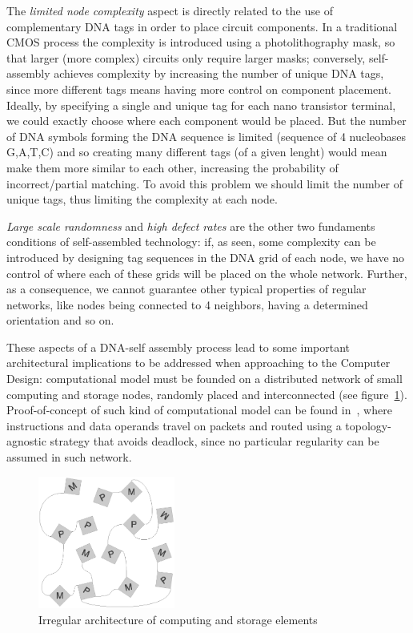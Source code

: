 The \emph{limited node complexity} aspect is directly
related to the use of complementary DNA tags in order to place circuit
components. In a traditional CMOS process the complexity is introduced
using a photolithography mask, so that larger (more complex) circuits
only require larger masks; conversely, self-assembly achieves
complexity by increasing the number of unique DNA tags, since more
different tags means having more control on component placement. Ideally, by specifying a single
and unique tag for each nano transistor terminal, we could exactly
choose where each component would be placed. But the number of DNA
symbols forming the DNA sequence is limited (sequence of 4 nucleobases
G,A,T,C) and so creating many different tags (of a given lenght) would
mean make them more similar to each other, increasing the probability
of incorrect/partial matching. To avoid this problem we should limit
the number of unique tags, thus limiting the complexity at each node. 

\emph{Large scale randomness} and \emph{high defect rates} are the other two fundaments
conditions of self-assembled technology: if, as seen, some complexity
can be introduced by designing tag sequences in the DNA grid of each
node, we have no control of where each of these grids will be placed
on the whole network. Further, as a consequence, we cannot guarantee
other typical properties of regular networks, like nodes being
connected to 4 neighbors, having a determined orientation and so on.

These aspects of a DNA-self assembly process lead to some important
architectural implications to be addressed when approaching to the
Computer Design: computational model must be founded on a distributed
network of small computing and storage nodes, randomly placed and
interconnected (see figure~\ref{fig:nana}).  Proof-of-concept of such kind of computational model
can be found in~\cite{patwardhan2006_1}, where instructions and data operands travel
on packets and routed using a topology-agnostic strategy that avoids
deadlock, since no particular regularity can be assumed in such
network. 

\begin{figure}
  \centering
    \includegraphics[width=0.40\textwidth]{pictures/dna1.eps}
  \caption{Irregular architecture of computing and storage elements}
  \label{fig:nana}
\end{figure}

